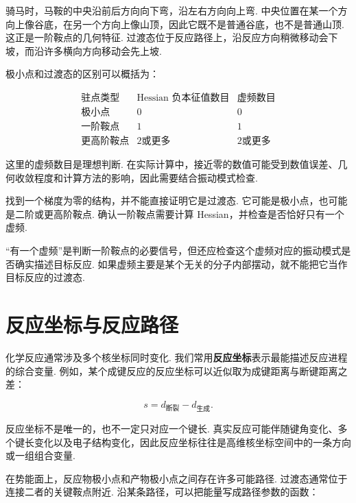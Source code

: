 \documentclass[UTF8,11pt,a4paper,openany]{ctexbook}
\newcommand{\term}[1]{\textbf{#1}}
\begin{document}
\begin{analogybox}
骑马时，马鞍的中央沿前后方向向下弯，沿左右方向向上弯. 中央位置在某一个方向上像谷底，在另一个方向上像山顶，因此它既不是普通谷底，也不是普通山顶. 这正是一阶鞍点的几何特征. 过渡态位于反应路径上，沿反应方向稍微移动会下坡，而沿许多横向方向移动会先上坡. 
\end{analogybox}

极小点和过渡态的区别可以概括为：

\[
\begin{array}{c|c|c}
\text{驻点类型} & \text{Hessian 负本征值数目} & \text{虚频数目}\\
\hline
\text{极小点} & 0 & 0\\
\text{一阶鞍点} & 1 & 1\\
\text{更高阶鞍点} & 2\text{或更多} & 2\text{或更多}
\end{array}
\]

这里的虚频数目是理想判断. 在实际计算中，接近零的数值可能受到数值误差、几何收敛程度和计算方法的影响，因此需要结合振动模式检查. 

\begin{limitbox}
找到一个梯度为零的结构，并不能直接证明它是过渡态. 它可能是极小点，也可能是二阶或更高阶鞍点. 确认一阶鞍点需要计算 Hessian，并检查是否恰好只有一个虚频. 
\end{limitbox}

\begin{limitbox}
“有一个虚频”是判断一阶鞍点的必要信号，但还应检查这个虚频对应的振动模式是否确实描述目标反应. 如果虚频主要是某个无关的分子内部摆动，就不能把它当作目标反应的过渡态. 
\end{limitbox}

\section{反应坐标与反应路径}

化学反应通常涉及多个核坐标同时变化. 我们常用\term{反应坐标}表示最能描述反应进程的综合变量. 例如，某个成键反应的反应坐标可以近似取为成键距离与断键距离之差：

\[
s=d_{\text{断裂}}-d_{\text{生成}}.
\]

反应坐标不是唯一的，也不一定只对应一个键长. 真实反应可能伴随键角变化、多个键长变化以及电子结构变化，因此反应坐标往往是高维核坐标空间中的一条方向或一组组合变量. 

在势能面上，反应物极小点和产物极小点之间存在许多可能路径. 过渡态通常位于连接二者的关键鞍点附近. 沿某条路径，可以把能量写成路径参数的函数：
\end{document}
